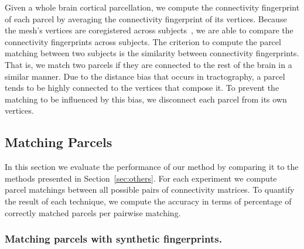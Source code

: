Given a whole brain cortical parcellation, we compute the connectivity fingerprint of each parcel by averaging the connectivity fingerprint of its vertices. Because the mesh's vertices are coregistered across subjects~\cite{Glasser2013}, we are able to compare the connectivity fingerprints across subjects. The criterion to compute the parcel matching between two subjects is the similarity between connectivity fingerprints. That is, we match two parcels if they are connected to the rest of the brain in a similar manner. Due to the distance bias that occurs in tractography, a parcel tends to be highly connected to the vertices that compose it. To prevent the matching to be influenced by this bias, we disconnect each parcel from its own vertices.

 
\subsection{Matching Parcels}
\label{sec:matching}
In this section we evaluate the performance of our method by comparing it to the methods presented in Section~\ref{sec:others}. For each experiment we compute parcel matchings between all possible pairs of connectivity matrices. To quantify the result of each technique, we compute the accuracy in terms of percentage of correctly matched parcels per pairwise matching.

\subsubsection{Matching parcels with synthetic fingerprints.}

